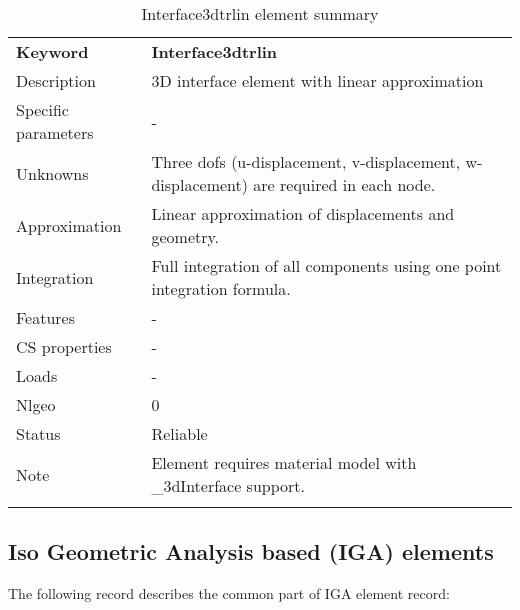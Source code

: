\documentclass[a4paper]{article}
\newcommand{\param}[1]{\texttt{#1}} %
\newcommand{\templabel}{}%
\newcommand{\tempcaption}{}%
\newcounter{nelpar}
\newenvironment{elementsummary}[5]{%
  \gdef\tempcaption{#4}%
  \gdef\templabel{#5}%
  \setcounter{nelpar}{0}%
  \begin{center} %
    \begin{table}[!htb] %
      \begin{tabular}{|l|p{9cm}|}\hline %
        {\bf Keyword} & \bf{#1}\\ %
        {Description} & {#2}\\ %
        {Specific parameters} & {#3}\\ \hline %
}{%
  \\ \hline %
      \end{tabular}%
      \caption{\tempcaption}%
      \label{\templabel}%
    \end{table}%
  \end{center}%
}
\newcommand{\elementParam}[1]{%
  \ifthenelse{\value{nelpar}>0} %
             {&{#1}}%
             {\setcounter{nelpar}{1}Parameters&{#1}}%
             \\%
}
\newcommand{\elementDescription}[2]{{#1} & {#2}\\ }
\begin{document}
\begin{elementsummary}{Interface3dtrlin}{3D  interface element with linear approximation}{-}{Interface3dtrlin element summary}{Interface3dtrlinsummary}
\elementDescription{Unknowns}{Three dofs (u-displacement, v-displacement, w-displacement) are required in each node.}
\elementDescription{Approximation}{Linear approximation of displacements and geometry.}
\elementDescription{Integration}{Full integration of all components using one point integration formula.}
\elementDescription{Features}{-}
\elementDescription{CS properties}{-}
\elementDescription{Loads}{-}
\elementDescription{Nlgeo}{0}
\elementDescription{Status}{Reliable}
\elementDescription{Note}{Element requires material model with \_3dInterface support.}
\end{elementsummary}

\clearpage
\subsection{Iso Geometric Analysis based (IGA) elements}
The following record describes the common part of IGA element record:
 
\end{document}
